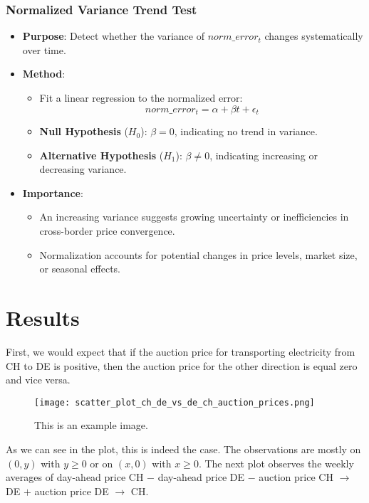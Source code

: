 \documentclass[12pt]{article}
\begin{document}
\subsubsection {Normalized Variance Trend Test}
\begin{itemize}
    \item \textbf{Purpose}: Detect whether the variance of $norm\_error_t$ changes systematically over time.

    \item \textbf{Method}:
    \begin{itemize}
        \item Fit a linear regression to the normalized error:
        \[
        norm\_error_t = \alpha + \beta t + \epsilon_t
        \]
        \item \textbf{Null Hypothesis} ($H_0$): $\beta = 0$, indicating no trend in variance.
        \item \textbf{Alternative Hypothesis} ($H_1$): $\beta \neq 0$, indicating increasing or decreasing variance.
    \end{itemize}

    \item \textbf{Importance}:
    \begin{itemize}
        \item An increasing variance suggests growing uncertainty or inefficiencies in cross-border price convergence.
        \item Normalization accounts for potential changes in price levels, market size, or seasonal effects.
    \end{itemize}
\end{itemize}

\section{Results}
First, we would expect that if the auction price for transporting electricity from CH to DE is positive, then the auction price for the other direction is equal zero and vice versa. 

\begin{figure}[h!]
    \centering
    \texttt{[image: scatter\_plot\_ch\_de\_vs\_de\_ch\_auction\_prices.png]}
    \caption{This is an example image.}
    \label{fig:1}
\end{figure}
\newpage
\noindent
As we can see in the plot, this is indeed the case. The observations are mostly on $(0, y)$ with $y \geq 0$ or on $(x, 0)$ with $x \geq 0$. The next plot observes the weekly averages of day-ahead price CH $-$ day-ahead price DE $-$ auction price CH $\to$ DE $+$ auction price DE $\to$ CH.
\end{document}
